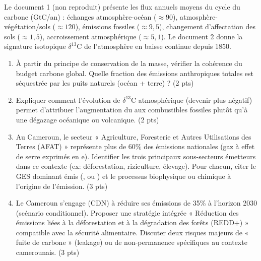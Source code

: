 \documentclass[11pt]{article}
\begin{document}
\begin{exercice}
Le document 1 (non reproduit) présente les flux annuels moyens du cycle du carbone (GtC/an) : échanges atmosphère-océan ($\approx 90$), atmosphère-végétation/sols ($\approx 120$), émissions fossiles ($\approx 9,5$), changement d'affectation des sols ($\approx 1,5$), accroissement atmosphérique ($\approx 5,1$). Le document 2 donne la signature isotopique $\delta^{13}\text{C}$ de l'atmosphère en baisse continue depuis 1850.

\begin{enumerate}
    \item À partir du principe de conservation de la masse, vérifier la cohérence du budget carbone global. Quelle fraction des émissions anthropiques totales est séquestrée par les puits naturels (océan + terre) ? (2 pts)
    \item Expliquer comment l'évolution de $\delta^{13}\text{C}$ atmosphérique (devenir plus négatif) permet d'attribuer l'augmentation du  aux combustibles fossiles plutôt qu'à une dégazage océanique ou volcanique. (2 pts)
    \item Au Cameroun, le secteur « Agriculture, Foresterie et Autres Utilisations des Terres (AFAT) » représente plus de 60\% des émissions nationales (gaz à effet de serre exprimés en e). Identifier les trois principaux sous-secteurs émetteurs dans ce contexte (ex: déforestation, riziculture, élevage). Pour chacun, citer le GES dominant émis (,  ou ) et le processus biophysique ou chimique à l'origine de l'émission. (3 pts)
    \item Le Cameroun s'engage (CDN) à réduire ses émissions de 35\% à l'horizon 2030 (scénario conditionnel). Proposer une stratégie intégrée « Réduction des émissions liées à la déforestation et à la dégradation des forêts (REDD+) » compatible avec la sécurité alimentaire. Discuter deux risques majeurs de « fuite de carbone » (leakage) ou de non-permanence spécifiques au contexte camerounais. (3 pts)
\end{enumerate}
\end{exercice}
\end{document}
